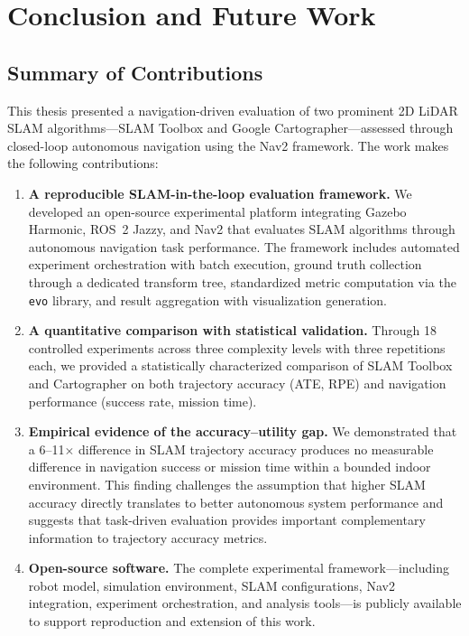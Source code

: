 \chapter{Conclusion and Future Work}
\label{ch:conclusion}

\section{Summary of Contributions}

This thesis presented a navigation-driven evaluation of two prominent 2D LiDAR SLAM algorithms---SLAM Toolbox and Google Cartographer---assessed through closed-loop autonomous navigation using the Nav2 framework. The work makes the following contributions:

\begin{enumerate}
\item \textbf{A reproducible SLAM-in-the-loop evaluation framework.} We developed an open-source experimental platform integrating Gazebo Harmonic, ROS~2 Jazzy, and Nav2 that evaluates SLAM algorithms through autonomous navigation task performance. The framework includes automated experiment orchestration with batch execution, ground truth collection through a dedicated transform tree, standardized metric computation via the \texttt{evo} library, and result aggregation with visualization generation.

\item \textbf{A quantitative comparison with statistical validation.} Through 18 controlled experiments across three complexity levels with three repetitions each, we provided a statistically characterized comparison of SLAM Toolbox and Cartographer on both trajectory accuracy (ATE, RPE) and navigation performance (success rate, mission time).

\item \textbf{Empirical evidence of the accuracy--utility gap.} We demonstrated that a 6--11$\times$ difference in SLAM trajectory accuracy produces no measurable difference in navigation success or mission time within a bounded indoor environment. This finding challenges the assumption that higher SLAM accuracy directly translates to better autonomous system performance and suggests that task-driven evaluation provides important complementary information to trajectory accuracy metrics.

\item \textbf{Open-source software.} The complete experimental framework---including robot model, simulation environment, SLAM configurations, Nav2 integration, experiment orchestration, and analysis tools---is publicly available to support reproduction and extension of this work.
\end{enumerate}

